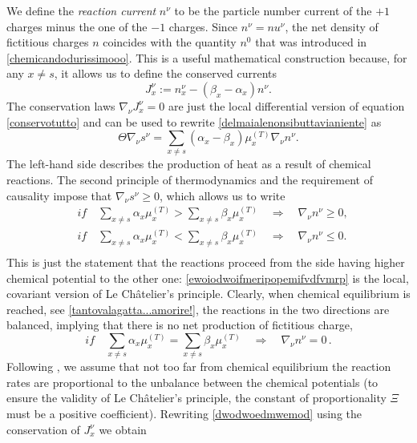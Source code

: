 \documentclass[usenatbib]{mnras}
\begin{document}
We define the \emph{reaction current} $n^\nu$ to be the particle number current of the $+1$ charges minus the one of the $-1$ charges. Since  $n^\nu = n u^\nu$, the net density of fictitious charges $n$ coincides with  the quantity $n^0$ that was introduced in \ref{chemicandodurissimooo}. This is a useful mathematical construction because, for any $x\neq s$, it allows us to define the conserved currents 
%
\begin{equation}
J_x^\nu := n_x^\nu - (\beta_x - \alpha_x)n^\nu .
\end{equation}    
%
The conservation laws  $\nabla_\nu J_x^\nu=0$ are just the local differential version of equation \eqref{conservotutto} and can be used to rewrite \eqref{delmaialenonsibuttavianiente} as
%
\begin{equation}\label{propropropro}
\Theta \nabla_\nu s^\nu =  \sum_{x \neq s} ( \alpha_x  - \beta_x) \mu_x^{(T)} \nabla_\nu n^\nu.
\end{equation}
%
The left-hand side describes the production of heat as a result of chemical reactions. 
The second principle of thermodynamics and the requirement of causality  impose that $\nabla_\nu s^\nu \geq 0$, which allows us to write
%
\begin{equation}\label{ewoiodwoifmeripopemifvdfvmrp}
\begin{split}
& if \quad \sum_{x \neq s} \alpha_x \mu_x^{(T)} > \sum_{x \neq s} \beta_x \mu_x^{(T)} \quad \Longrightarrow \quad \nabla_\nu n^\nu \geq 0, \\
& if \quad \sum_{x \neq s} \alpha_x \mu_x^{(T)} < \sum_{x \neq s} \beta_x \mu_x^{(T)} \quad \Longrightarrow \quad \nabla_\nu n^\nu \leq 0. \\
\end{split}
\end{equation}
%
This is just the statement that the reactions proceed from the side having higher chemical potential to the other one: \eqref{ewoiodwoifmeripopemifvdfvmrp} is the local, covariant version of Le Ch\^atelier's principle. 
Clearly, when chemical equilibrium is reached, see \eqref{tantovalagatta...amorire!}, the reactions in the two directions are balanced, implying that there is no net production of fictitious charge,
%
\begin{equation}
if \quad \sum_{x \neq s} \alpha_x \mu_x^{(T)} = \sum_{x \neq s} \beta_x \mu_x^{(T)} \quad \Longrightarrow \quad \nabla_\nu n^\nu = 0 \, .
\end{equation}
%
Following \cite{langlois98}, we assume that  not too far from chemical equilibrium  the reaction rates are proportional to the unbalance between the chemical potentials (to ensure the validity of Le Ch\^atelier's principle, the constant of proportionality  $\Xi$ must be a positive coefficient). Rewriting \eqref{dwodwoedmwemod} using the conservation of $J_x^\nu$ we obtain 
\end{document}
